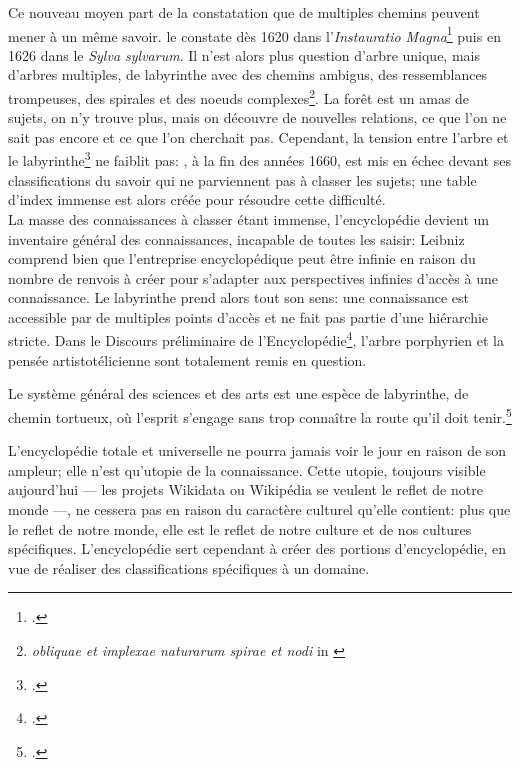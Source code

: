 Ce nouveau moyen part de la constatation que de multiples chemins peuvent mener à un même savoir.  le constate dès 1620 dans l'\textit{Instauratio Magna}\footcite{bacon_instauratio_1620} puis en 1626 dans le \textit{Sylva sylvarum}. Il n'est alors plus question d'arbre unique, mais d'arbres multiples, de labyrinthe avec des chemins ambigus, des ressemblances trompeuses, des spirales et des noeuds complexes\footnote{\og \textit{obliquae et implexae naturarum spirae et nodi}\fg{} in \cite{bacon_instauratio_1620}}. La forêt est un amas de sujets, on n'y trouve plus, mais on découvre de nouvelles relations, ce que l'on ne sait pas encore et ce que l'on cherchait pas. Cependant, la \og tension entre l'arbre et le labyrinthe\fg{}\footcite{eco_arbre_2010} ne faiblit pas: , à la fin des années 1660, est mis en échec devant ses classifications du savoir qui ne parviennent pas à classer les sujets; une table d'index immense est alors créée pour résoudre cette difficulté.\\

La masse des connaissances à classer étant immense, l'encyclopédie devient un inventaire général des connaissances, incapable de toutes les saisir: Leibniz comprend bien que l'entreprise encyclopédique peut être infinie en raison du nombre de renvois à créer pour s'adapter aux perspectives infinies d'accès à une connaissance. Le labyrinthe prend alors tout son sens: une connaissance est accessible par de multiples points d'accès et ne fait pas partie d'une hiérarchie stricte. Dans le \og Discours préliminaire\fg{} de l'Encyclopédie\footcite{diderot_encyclope_1751}, l'arbre porphyrien et la pensée artistotélicienne sont totalement remis en question. 
\begin{citationLongue}
	Le système général des sciences et des arts est une espèce de labyrinthe, de chemin tortueux, où l'esprit s'engage sans trop connaître la route qu'il doit tenir.\footcite[Discours préliminaire]{diderot_encyclope_1751}
\end{citationLongue}
L'encyclopédie totale et universelle ne pourra jamais voir le jour en raison de son ampleur; elle n'est qu'utopie de la connaissance. Cette utopie, toujours visible aujourd'hui --- les projets Wikidata ou Wikipédia se veulent le reflet de notre monde ---, ne cessera pas en raison du caractère culturel qu'elle contient: plus que le reflet de notre monde, elle est le reflet de notre culture et de nos cultures spécifiques. L'encyclopédie sert cependant à créer des portions d'encyclopédie, en vue de réaliser des classifications spécifiques à un domaine.

